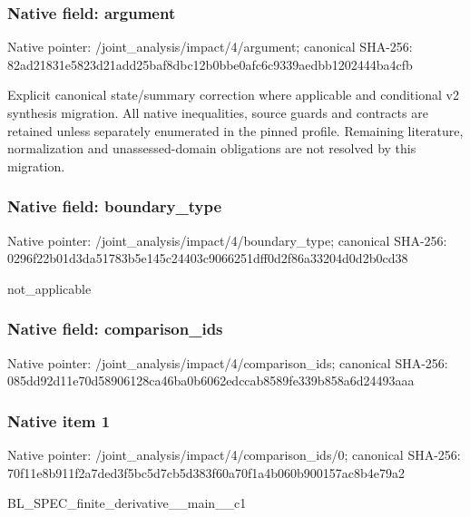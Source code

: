 \documentclass[10pt,a4paper]{article}
\begin{document}
\subsubsection{Native field: argument}
Native pointer: /joint\_\allowbreak{}analysis/impact/4/argument; canonical SHA-256: 82ad21831e5823d21add25baf8dbc12b0bbe0afc6c9339aedbb1202444ba4cfb

\begingroup\raggedright\sloppy Explicit canonical state/\allowbreak{}summary correction where applicable and conditional v2 synthesis migration. All native inequalities,\allowbreak{} source guards and contracts are retained unless separately enumerated in the pinned profile. Remaining literature,\allowbreak{} normalization and unassessed-domain obligations are not resolved by this migration.\par\endgroup

\subsubsection{Native field: boundary\_\allowbreak{}type}
Native pointer: /joint\_\allowbreak{}analysis/impact/4/boundary\_\allowbreak{}type; canonical SHA-256: 0296f22b01d3da51783b5e145c24403c9066251dff0d2f86a33204d0d2b0cd38

\begingroup\raggedright\sloppy not\_\allowbreak{}applicable\par\endgroup

\subsubsection{Native field: comparison\_\allowbreak{}ids}
Native pointer: /joint\_\allowbreak{}analysis/impact/4/comparison\_\allowbreak{}ids; canonical SHA-256: 085dd92d11e70d58906128ca46ba0b6062edccab8589fe339b858a6d24493aaa

\subsubsection{Native item 1}
Native pointer: /joint\_\allowbreak{}analysis/impact/4/comparison\_\allowbreak{}ids/0; canonical SHA-256: 70f11e8b911f2a7ded3f5bc5d7cb5d383f60a70f1a4b060b900157ac8b4e79a2

\begingroup\raggedright\sloppy BL\_\allowbreak{}SPEC\_\allowbreak{}finite\_\allowbreak{}derivative\_\allowbreak{}\_\allowbreak{}main\_\allowbreak{}\_\allowbreak{}c1\par\endgroup
\end{document}

